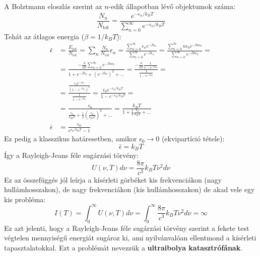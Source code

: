 \documentclass[../main.tex]{subfiles}
\begin{document}
A Bolztmann eloszlás szerint az $n$-edik állapotban lévő objektumok száma:
\begin{equation}
    \frac{N_n}{N_{\text{tot}}} = \frac{e^{-\epsilon_n / k_BT}}{ \sum_{n=0}^{\infty} e^{-\epsilon_n / k_BT}}
\end{equation}
Tehát az átlagos energia ($\beta = 1/k_BT$):
\begin{equation}
    \begin{aligned}
    \bar{\epsilon} &= \frac{E_{\text{tot}}}{N_{\text{tot}}} = \sum_{n} \frac{N_n}{N_{\text{tot}}} \epsilon_n = \frac{\sum_{n=0}^{\infty} \epsilon_n e^{-\beta \epsilon_n}}{\sum_{n=0}^{\infty} e^{-\beta \epsilon_n}} =  \frac{\sum_{n=0}^{\infty} n \epsilon_0 e^{-\beta n \epsilon_0}}{\sum_{n=0}^{\infty} e^{-\beta n \epsilon_0}} = \\
    &= \frac{-\frac{\partial}{\partial \beta }\sum_{n=0}^{\infty} e^{-\beta n \epsilon_0}}{1 + e^{-\beta \epsilon_0} + (e^{-\beta \epsilon_0})^2 + \ldots} = \frac{-\frac{\partial}{\partial \beta }\frac{1}{1 - e^{-\beta \epsilon_0}}}{\frac{1}{1 - e^{-\beta \epsilon_0}}} = \\
    &= \frac{\frac{\epsilon_0 e^{-\beta \epsilon_0}}{(1 - e^{-\beta \epsilon_0})^2}}{\frac{1}{1 - e^{-\beta \epsilon_0}}} = \frac{\epsilon_0 e^{-\epsilon_0 / k_BT}}{1 - e^{-\epsilon_0 / k_BT}} = \\
    &= \frac{\epsilon_0}{\frac{\epsilon_0}{k_BT} + \frac{1}{2} \left( \frac{\epsilon_0}{k_BT} \right)^2 + \ldots} = \frac{k_BT}{1 + \frac{1}{2} \frac{\epsilon_0}{k_BT} + \ldots} \\
    \bar{\epsilon} &= \frac{\epsilon_0}{e^{\epsilon_0 / k_BT} - 1}
    \end{aligned}
\end{equation}
Ez pedig a klasszikus határesetben, amikor $\epsilon_0 \to 0$ (ekvipartíció tétele):
\begin{equation}
    \bar{\epsilon} = k_BT
\end{equation}
Így a Rayleigh-Jeans féle sugárzási törvény:
\begin{equation}
    U(\nu, T) d\nu = \frac{8 \pi}{c^3} k_BT \nu^2 d\nu
\end{equation}
Ez az összefüggés jól leírja a kísérleti görbéket kis frekvenciákon (nagy hullámhosszakon), de nagy frekvenciákon (kis hullámhosszakon) de akad vele egy kis probléma:
\begin{equation}
    I(T) = \int_0^{\infty} U(\nu, T) d\nu = \int_0^{\infty} \frac{8 \pi}{c^3} k_BT \nu^2 d\nu = \infty
\end{equation}
Ez azt jelenti, hogy a Rayleigh-Jeans féle sugárzási törvény szerint a fekete test végtelen mennyiségű energiát sugároz ki, ami nyilvánvalóan ellentmond a kísérleti tapasztalatokkal. Ezt a problémát nevezzük a \textbf{ultraibolya katasztrófának}.
\end{document}
